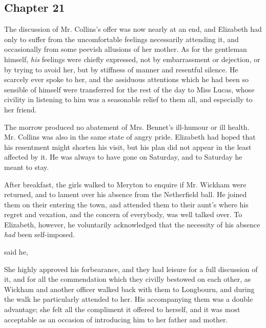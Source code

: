 \subsection[chapter-21]{\useURL[url21][][][]\from[url21] Chapter 21}

The discussion of Mr. Collins's offer was now nearly at an end, and Elizabeth had only to suffer from the uncomfortable feelings necessarily attending it, and occasionally from some peevish allusions of her mother. As for the gentleman himself, {\em his} feelings were chiefly expressed, not by embarrassment or dejection, or by trying to avoid her, but by stiffness of manner and resentful silence. He scarcely ever spoke to her, and the assiduous attentions which he had been so sensible of himself were transferred for the rest of the day to Miss Lucas, whose civility in listening to him was a seasonable relief to them all, and especially to her friend.

The morrow produced no abatement of Mrs. Bennet's ill-humour or ill health. Mr. Collins was also in the same state of angry pride. Elizabeth had hoped that his resentment might shorten his visit, but his plan did not appear in the least affected by it. He was always to have gone on Saturday, and to Saturday he meant to stay.

After breakfast, the girls walked to Meryton to enquire if Mr. Wickham were returned, and to lament over his absence from the Netherfield ball. He joined them on their entering the town, and attended them to their aunt's where his regret and vexation, and the concern of everybody, was well talked over. To Elizabeth, however, he voluntarily acknowledged that the necessity of his absence {\em had} been self-imposed.

 said he, 

She highly approved his forbearance, and they had leisure for a full discussion of it, and for all the commendation which they civilly bestowed on each other, as Wickham and another officer walked back with them to Longbourn, and during the walk he particularly attended to her. His accompanying them was a double advantage; she felt all the compliment it offered to herself, and it was most acceptable as an occasion of introducing him to her father and mother.

